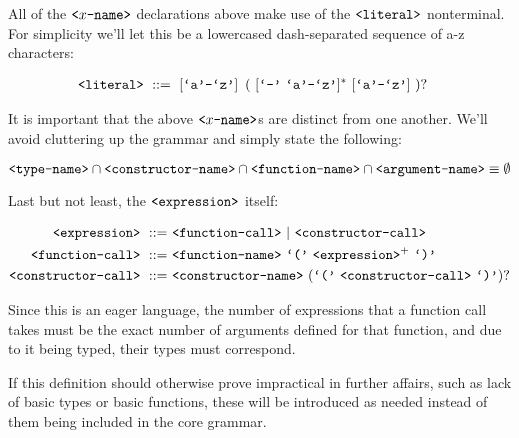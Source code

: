 All of the $\text{{\ttfamily<}}x\text{{\ttfamily-name>}}$ declarations above make use of the
$\text{{\ttfamily<literal>}}$ nonterminal. For simplicity we'll let this be a lowercased
dash-separated sequence of a-z characters:

\begin{align}
\text{{\ttfamily<literal>}}\ &::=\ [\text{{\ttfamily`a'}}\text{{\ttfamily-}}\text{{\ttfamily`z'}}]
\ \left (\ [\text{{\ttfamily`-'}}\ \text{{\ttfamily`a'}}\text{{\ttfamily-}}\text{{\ttfamily`z'}}]^*
\ [\text{{\ttfamily`a'}}\text{{\ttfamily-}}\text{{\ttfamily`z'}}]\ \right )?
\end{align}

It is important that the above $\text{{\ttfamily<}}x\text{{\ttfamily-name>}}$s are distinct
from one another. We'll avoid cluttering up the grammar and simply state the
following:

$$\text{{\ttfamily<type-name>}}\cap\text{{\ttfamily<constructor-name>}}\cap\text{{\ttfamily<function-name>}}
\cap\text{{\ttfamily<argument-name>}}\equiv\emptyset$$

Last but not least, the $\text{{\ttfamily<expression>}}$ itself:

\begin{align}
\nonterm{expression}\ ::=&\ \nonterm{function-call}\ |\ \nonterm{constructor-call}\\
\nonterm{function-call}\ ::=&\ \nonterm{function-name}\ \term{(}
\ \nonterm{expression}^+\ \term{)}\\
\nonterm{constructor-call}\ ::=&\ \nonterm{constructor-name}
\ (\term{(}\ \nonterm{constructor-call}\ \term{)})?
\end{align}

Since this is an eager language, the number of expressions that a function call
takes must be the exact number of arguments defined for that function, and due
to it being typed, their types must correspond.

If this definition should otherwise prove impractical in further affairs, such
as lack of basic types or basic functions, these will be introduced as needed
instead of them being included in the core grammar.
